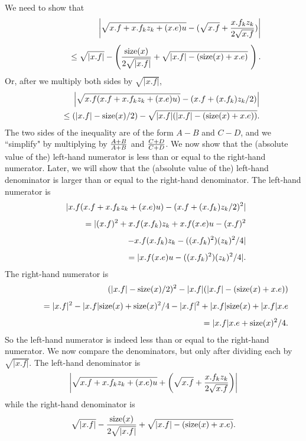 We need to show that 
\begin{eqnarray*}
&&\hskip-35pt \left|\sqrt {x.f + x.f_k z_k + (x.e) u} - (\sqrt{x.f} + {x.f_k z_k\over 2 \sqrt {x.f}})\right|\\[4pt]
&&\qquad \le \sqrt{|x.f|} - \left({{\rm size}(x) \over 2 \sqrt {|x.f|}} + \sqrt {|x.f| - ({\rm size}(x) + x.e)}\ \right).
\end{eqnarray*}
Or, after we multiply both sides by $\sqrt {|x.f|}$,  
\begin{eqnarray*}
&&
\hskip-35pt\left| \sqrt {x.f (x.f + x.f_k z_k + (x.e) u)} - (x.f + (x.f_k) z_k /2) \right|\\
&&\quad \le \left( |x.f| - {\rm size}(x) /2\right) - \sqrt {|x.f|(|x.f| - ({\rm size}(x) +
x.e))}.
\end{eqnarray*}
 The two  sides of the inequality are of the form $ A - B$ and $C - D$, and we
``simplify" by multiplying by  
${ A+ B \over A + B}$ and ${ C+ D \over C + D}$.   We now show that the (absolute value of the) left-hand numerator is less than or equal to the right-hand numerator.  Later, we will show that the (absolute value of the) left-hand denominator is larger than or equal to the right-hand denominator. 
The   left-hand numerator is 
\begin{eqnarray*}
&&\hskip-35pt |x.f (x.f + x.f_k z_k + (x.e) u) - (x.f + (x.f_k) z_k /2)^2|\\[4pt]
&&\qquad 
 = |(x.f)^ 2 + x.f (x.f_k) z_k + x.f (x.e) u - (x.f)^2\\[4pt]
&&\qquad\quad - x.f (x.f_k) z_k - ((x.f_k)^2) (z_k)^2/4|\\[4pt]
&&\qquad = |x.f (x.e) u - ((x.f_k)^2) (z_k)^2/4|.
\end{eqnarray*}
The right-hand numerator is 
\begin{eqnarray*}
&&(|x.f| - {\rm size}(x)/2)^2 - |x.f| (|x.f| - ({\rm size}(x) + x.e))\\[4pt]
&&\qquad = |x.f|^2 - |x.f| {\rm size}(x) + {\rm size}(x)^2/4 - |x.f|^2 + |x.f| {\rm
size}(x) + |x.f| x.e\\[4pt]
&&\qquad = |x.f| x.e + {\rm size}(x)^2/4.
\end{eqnarray*}
So the left-hand numerator is indeed less than or equal to the right-hand numerator.
We now compare the denominators, but only after dividing each by
$\sqrt {|x.f|}$. 
The left-hand denominator is
$$\left|\sqrt {x.f + x.f_k z_k + (x.e) u} + 
\left(\sqrt {x.f} + {x.f_k z_k\over 2 \sqrt{x.f}}\right)\right|$$
while the right-hand denominator is 
$$\sqrt{|x.f|} - {{\rm size}(x) \over 2 \sqrt {|x.f|}} + \sqrt {|x.f| - ({\rm size}(x) + x.e)}. \pagebreak$$
